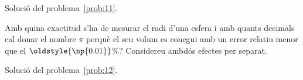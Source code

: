 \documentclass[a4paper,twoside,12pt]{exam}
\newcommand{\osnp}[1]{\oldstyle{\np{#1}}}
\begin{document}
\begin{questions}
\begin{solution}
	Solució del problema~\ref{prob:11}. 
\end{solution}

\question\label{prob:12}
Amb quina exactitud s'ha de mesurar el radi d'una esfera i amb quants 
decimals cal donar el nombre $\pi$ perquè el seu volum es conegui amb 
un error relatiu menor que el $\osnp{0.01}$\%? Considereu ambdós 
efectes per separat.
\begin{solution}
	Solució del problema~\ref{prob:12}.
\end{solution}
\end{questions}

\ifprintanswers 


\fi
\end{document}
